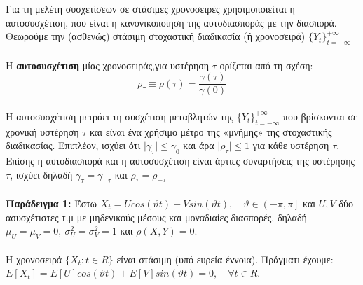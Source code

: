 Για τη μελέτη συσχετίσεων σε στάσιμες χρονοσειρές χρησιμοποιείται η
αυτοσυσχέτιση, που είναι η κανονικοποίηση της αυτοδιασποράς με την διασπορά.\\
Θεωρούμε την (ασθενώς) στάσιμη στοχαστική διαδικασία (ή χρονοσειρά) $\{Y_t\}_{t=-\infty}^{+\infty}$\\\\
H \textbf{αυτοσυσχέτιση} μίας χρονοσειράς,για υστέρηση $\tau$ ορίζεται από τη 
σχέση:\\
$$ \rho_\tau\equiv\rho\left( \tau\right) =\frac{\gamma\left(  \tau\right) }{\gamma\left( 0\right) } $$\\
Η αυτοσυσχέτιση μετράει τη συσχέτιση μεταβλητών της $\{Y_t\}_{t=-\infty}^{+\infty}$ που βρίσκονται
σε χρονική υστέρηση $\tau$ και είναι ένα χρήσιμο μέτρο της «μνήμης» της στοχαστικής
διαδικασίας. Επιπλέον, ισχύει ότι $\mid \gamma_\tau\mid\leq\gamma_0 $ και άρα $ \mid\rho_\tau\mid\leq1 $ για κάθε υστέρηση $\tau$. Επίσης η
αυτοδιασπορά και η αυτοσυσχέτιση είναι άρτιες συναρτήσεις της υστέρησης $\tau$, ισχύει
δηλαδή $ \gamma_\tau=\gamma_{-\tau} $ και $\rho_\tau=\rho_{-\tau}$\\\\
%
\textbf{ Παράδειγμα 1:} Έστω $ X_t=Ucos\left(\vartheta t\right)+Vsin\left(\vartheta t\right),\quad \vartheta \in \left(-\pi,\pi\right] $ και $U,V$ δύο ασυσχέτιστες τ.μ με μηδενικούς μέσους και μοναδιαίες διασπορές, δηλαδή $\mu_U=\mu_V=0,\: \sigma_U^2=\sigma_V^2=1$ και  $\rho\left(X,Y\right)=0. $\\ \\
Η χρονοσειρά $\{X_t:t \in R\}$ είναι στάσιμη (υπό ευρεία έννοια). Πράγματι έχουμε:\\
$E\left[X_t\right]=E\left[U\right]cos\left(\vartheta t\right) +E\left[V\right]sin\left(\vartheta t\right)=0,\quad \forall t \in R. $
